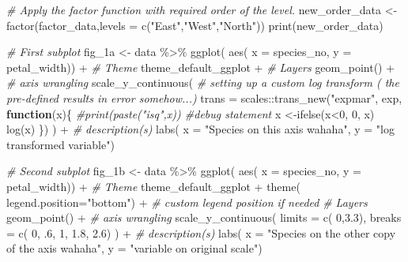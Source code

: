 \documentclass[
]{article}
\newenvironment{Shaded}{\begin{snugshade}}{\end{snugshade}}
\newcommand{\AttributeTok}[1]{\textcolor[rgb]{0.77,0.63,0.00}{#1}}
\newcommand{\CommentTok}[1]{\textcolor[rgb]{0.56,0.35,0.01}{\textit{#1}}}
\newcommand{\ControlFlowTok}[1]{\textcolor[rgb]{0.13,0.29,0.53}{\textbf{#1}}}
\newcommand{\DecValTok}[1]{\textcolor[rgb]{0.00,0.00,0.81}{#1}}
\newcommand{\FloatTok}[1]{\textcolor[rgb]{0.00,0.00,0.81}{#1}}
\newcommand{\FunctionTok}[1]{\textcolor[rgb]{0.00,0.00,0.00}{#1}}
\newcommand{\NormalTok}[1]{#1}
\newcommand{\OtherTok}[1]{\textcolor[rgb]{0.56,0.35,0.01}{#1}}
\newcommand{\SpecialCharTok}[1]{\textcolor[rgb]{0.00,0.00,0.00}{#1}}
\newcommand{\StringTok}[1]{\textcolor[rgb]{0.31,0.60,0.02}{#1}}
\begin{document}
\begin{Shaded}
\begin{Highlighting}[]
\CommentTok{\# Apply the factor function with required order of the level.}
\NormalTok{new\_order\_data }\OtherTok{\textless{}{-}} \FunctionTok{factor}\NormalTok{(factor\_data,}\AttributeTok{levels =} \FunctionTok{c}\NormalTok{(}\StringTok{"East"}\NormalTok{,}\StringTok{"West"}\NormalTok{,}\StringTok{"North"}\NormalTok{))}
\FunctionTok{print}\NormalTok{(new\_order\_data)}



\CommentTok{\# First subplot}
\NormalTok{fig\_1a }\OtherTok{\textless{}{-}} 
\NormalTok{data }\SpecialCharTok{\%\textgreater{}\%}
  \FunctionTok{ggplot}\NormalTok{( }\FunctionTok{aes}\NormalTok{( }\AttributeTok{x =}\NormalTok{ species\_no,}
               \AttributeTok{y =}\NormalTok{ petal\_width)) }\SpecialCharTok{+}
  \CommentTok{\# Theme}
\NormalTok{  theme\_default\_ggplot }\SpecialCharTok{+}
  \CommentTok{\# Layers}
  \FunctionTok{geom\_point}\NormalTok{() }\SpecialCharTok{+}
  \CommentTok{\# axis wrangling}
  \FunctionTok{scale\_y\_continuous}\NormalTok{( }
    \CommentTok{\# setting up a custom log transform ( the pre{-}defined results in error somehow...)}
    \AttributeTok{trans =}\NormalTok{ scales}\SpecialCharTok{::}\FunctionTok{trans\_new}\NormalTok{(}\StringTok{"expmar"}\NormalTok{, exp,}
            \ControlFlowTok{function}\NormalTok{(x)\{}
                \CommentTok{\#print(paste("isq",x))  \#debug statement}
\NormalTok{                x }\OtherTok{\textless{}{-}}\FunctionTok{ifelse}\NormalTok{(x}\SpecialCharTok{\textless{}}\DecValTok{0}\NormalTok{, }\DecValTok{0}\NormalTok{, x)}
                \FunctionTok{log}\NormalTok{(x)}
\NormalTok{              \})}
\NormalTok{  ) }\SpecialCharTok{+}
  \CommentTok{\# description(s)}
  \FunctionTok{labs}\NormalTok{( }\AttributeTok{x =} \StringTok{"Species on this axis wahaha"}\NormalTok{,}
        \AttributeTok{y =} \StringTok{"log transformed variable"}\NormalTok{)}


\CommentTok{\# Second subplot}
\NormalTok{fig\_1b }\OtherTok{\textless{}{-}} 
\NormalTok{data }\SpecialCharTok{\%\textgreater{}\%}
  \FunctionTok{ggplot}\NormalTok{( }\FunctionTok{aes}\NormalTok{( }\AttributeTok{x =}\NormalTok{ species\_no,}
               \AttributeTok{y =}\NormalTok{ petal\_width)) }\SpecialCharTok{+}
  \CommentTok{\# Theme}
\NormalTok{  theme\_default\_ggplot }\SpecialCharTok{+}
  \FunctionTok{theme}\NormalTok{( }\AttributeTok{legend.position=}\StringTok{"bottom"}\NormalTok{) }\SpecialCharTok{+} \CommentTok{\# custom legend position if needed}
  \CommentTok{\# Layers}
  \FunctionTok{geom\_point}\NormalTok{() }\SpecialCharTok{+}
  \CommentTok{\# axis wrangling}
  \FunctionTok{scale\_y\_continuous}\NormalTok{( }
    \AttributeTok{limits =} \FunctionTok{c}\NormalTok{( }\DecValTok{0}\NormalTok{,}\FloatTok{3.3}\NormalTok{),}
    \AttributeTok{breaks =} \FunctionTok{c}\NormalTok{( }\DecValTok{0}\NormalTok{, .}\DecValTok{6}\NormalTok{, }\DecValTok{1}\NormalTok{, }\FloatTok{1.8}\NormalTok{, }\FloatTok{2.6}\NormalTok{)}
\NormalTok{  ) }\SpecialCharTok{+}
  \CommentTok{\# description(s)}
  \FunctionTok{labs}\NormalTok{( }\AttributeTok{x =} \StringTok{"Species on the other copy of the axis wahaha"}\NormalTok{,}
        \AttributeTok{y =} \StringTok{"variable on original scale"}\NormalTok{)}


\end{Highlighting}
\end{Shaded}
\end{document}
